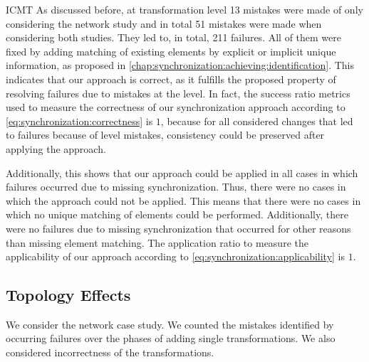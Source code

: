 \begin{copiedFrom}{ICMT}
As discussed before, at transformation level 13 mistakes were made of only considering the network study and in total 51 mistakes were made when considering both studies.
They led to, in total, 211 failures.
All of them were fixed by adding matching of existing elements by explicit or implicit unique information, as proposed in \autoref{chap:synchronization:achieving:identification}.
This indicates that our approach is correct, as it fulfills the proposed property of resolving failures due to mistakes at the \leveltransformation level.
In fact, the success ratio metrics used to measure the correctness of our synchronization approach according to \autoref{eq:synchronization:correctness} is $1$, because for all considered changes that led to failures because of \leveltransformation level mistakes, consistency could be preserved after applying the approach.

Additionally, this shows that our approach could be applied in all cases in which failures occurred due to missing synchronization.
Thus, there were no cases in which the approach could not be applied.
This means that there were no cases in which no unique matching of elements could be performed.
Additionally, there were no failures due to missing synchronization that occurred for other reasons than missing element matching.
The application ratio to measure the applicability of our approach according to \autoref{eq:synchronization:applicability} is $1$.


\subsection{Topology Effects}

We consider the network case study. We counted the mistakes identified by occurring failures over the phases of adding single transformations.
We also considered incorrectness of the transformations.


\end{copiedFrom}
